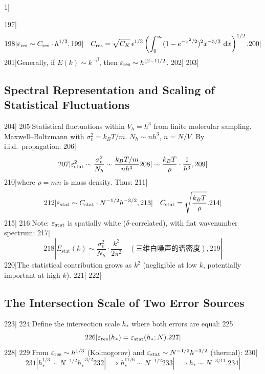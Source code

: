1|\documentclass[11pt,a4paper]{article}
\begin{document}
197|\begin{equation}\label{eq:eps_res_scaling_final}
198|  \varepsilon_{\text{res}} \sim C_{\text{res}} \cdot h^{1/3},
199|  \quad C_{\text{res}} = \sqrt{C_K}\,\epsilon^{1/3}\left(\int_{0}^{\infty} (1 - e^{-x^2/2})^2 x^{-5/3}\,\,\mathrm{d} x\right)^{1/2}.
200|\end{equation}
201|Generally, if $E(k) \sim k^{-\beta}$, then $\varepsilon_{\text{res}} \sim h^{(\beta-1)/2}$.
202|
203|\subsection{Spectral Representation and Scaling of Statistical Fluctuations}
204|
205|Statistical fluctuations within $V_h = h^3$ from finite molecular sampling. Maxwell--Boltzmann with $\sigma_v^2 = k_B T/m$. $N_h \sim n h^3$, $n = N/V$. By i.i.d.\ propagation:
206|\begin{equation}\label{eq:eps_stat_detail}
207|  \varepsilon_{\text{stat}}^2 \sim \frac{\sigma_v^2}{N_h} \sim \frac{k_B T/m}{n h^3}
208|  \sim \frac{k_B T}{\rho} \cdot \frac{1}{h^3},
209|\end{equation}
210|where $\rho = mn$ is mass density. Thus:
211|\begin{equation}\label{eq:eps_stat_scaling_final}
212|  \varepsilon_{\text{stat}} \sim C_{\text{stat}} \cdot N^{-1/2} h^{-3/2},
213|  \quad C_{\text{stat}} = \sqrt{\frac{k_B T}{\rho}}.
214|\end{equation}
215|
216|Note: $\varepsilon_{\text{stat}}$ is spatially white ($\delta$-correlated), with flat wavenumber spectrum:
217|\begin{equation}\label{eq:stat_spectrum}
218|  E_{\text{stat}}(k) \sim \frac{\sigma_v^2}{N_h} \cdot \frac{k^2}{2\pi^2} \quad (\text{三维白噪声的谱密度}),
219|\end{equation}
220|The statistical contribution grows as $k^2$ (negligible at low $k$, potentially important at high $k$).
221|
222|\subsection{The Intersection Scale of Two Error Sources}
223|
224|Define the intersection scale $h_*$ where both errors are equal:
225|\begin{equation}\label{eq:h_star_def}
226|  \varepsilon_{\text{res}}(h_*) = \varepsilon_{\text{stat}}(h_*; N).
227|\end{equation}
228|
229|From $\varepsilon_{\text{res}} \sim h^{1/3}$ (Kolmogorov) and $\varepsilon_{\text{stat}} \sim N^{-1/2} h^{-3/2}$ (thermal):
230|\begin{equation}\label{eq:h_star_value}
231|  h_*^{1/3} \sim N^{-1/2} h_*^{-3/2}
232|  \implies h_*^{11/6} \sim N^{-1/2}
233|  \implies h_* \sim N^{-3/11}.
234|\end{equation}
\end{document}
